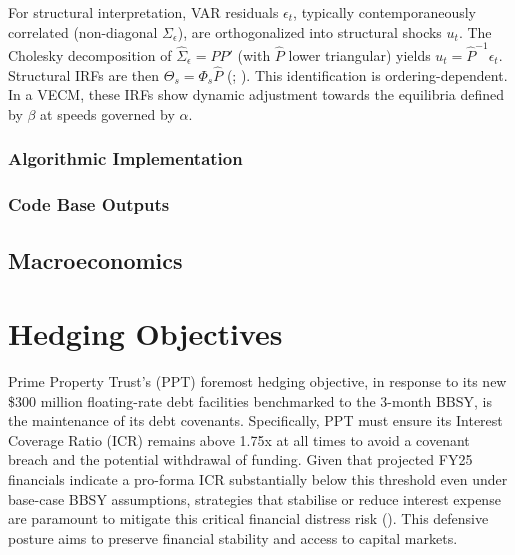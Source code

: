 \documentclass[11pt, a4paper, british]{article}
\begin{document}
For structural interpretation, VAR residuals $\epsilon_t$, typically contemporaneously correlated (non-diagonal $\Sigma_\epsilon$), are orthogonalized into structural shocks $u_t$. The Cholesky decomposition of $\hat{\Sigma}_\epsilon = \hat{P}\hat{P}'$ (with $\hat{P}$ lower triangular) yields $u_t = \hat{P}^{-1}\epsilon_t$. Structural IRFs are then $\Theta_s = \Phi_s \hat{P}$ (\cite{s}; \cite{l}). This identification is ordering-dependent. In a VECM, these IRFs show dynamic adjustment towards the equilibria defined by $\beta$ at speeds governed by $\alpha$.

\subsubsection{Algorithmic Implementation}

\newpage

\subsubsection{Code Base Outputs}

\newpage


\newpage

\subsection{Macroeconomics}

\newpage

\section{Hedging Objectives}

Prime Property Trust’s (PPT) foremost hedging objective, in response to its new \$300 million floating-rate debt facilities benchmarked to the 3-month BBSY, is the maintenance of its debt covenants. Specifically, PPT must ensure its Interest Coverage Ratio (ICR) remains above 1.75x at all times to avoid a covenant breach and the potential withdrawal of funding. Given that projected FY25 financials indicate a pro-forma ICR substantially below this threshold even under base-case BBSY assumptions, strategies that stabilise or reduce interest expense are paramount to mitigate this critical financial distress risk (\cite{ss}). This defensive posture aims to preserve financial stability and access to capital markets.
\end{document}
